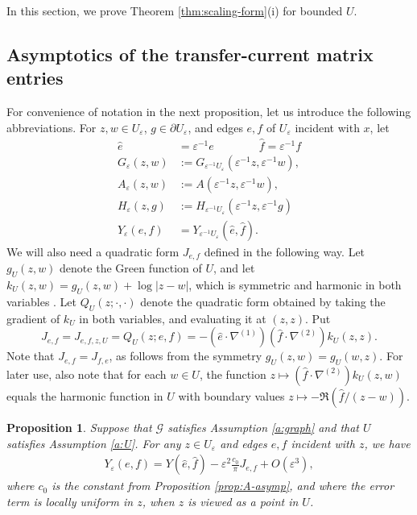 \documentclass[11pt]{article}
\newtheorem{proposition}[theorem]{Proposition}
\theoremstyle{remark}
\def\eps{\varepsilon}
\def\cG{\mathcal{G}}
\newcommand{\eqn}[2]{\begin{equation}\label{#1}#2\end{equation}}
\newcommand{\eqnspl}[2]{\begin{equation}\begin{split}\label{#1}%
   #2\end{split}\end{equation}}
\newcommand{\eqnsplst}[1]{\begin{equation*}\begin{split}%
   #1\end{split}\end{equation*}}
\begin{document}
In this section, we prove Theorem \ref{thm:scaling-form}(i) for bounded $U$.

\subsection{Asymptotics of the transfer-current matrix entries}
\label{ssec:transf-current}

For convenience of notation in the next proposition, let us introduce the following abbreviations. For 
$z, w \in U_\eps$, $g \in \partial U_\eps$, and edges $e, f$ of $U_\eps$ incident with $x$, let
\eqnsplst{
  \hat{e}
  &= \eps^{-1} e \qquad\qquad \hat{f} = \eps^{-1} f \\
  G_{\eps}(z,w)
  &:= G_{\eps^{-1} U_\eps} (\eps^{-1} z, \eps^{-1} w), \\
  A_\eps(z,w)
  &:= A(\eps^{-1} z, \eps^{-1} w), \\
  H_{\eps}(z,g)
  &:= H_{\eps^{-1} U_\eps} (\eps^{-1} z, \eps^{-1} g) \\
  Y_{\eps}(e,f)
  &= Y_{\eps^{-1} U_\eps} ( \hat{e}, \hat{f} ). }
We will also need a quadratic form $J_{e,f}$ defined in the following way. 
Let $g_U(z,w)$ denote the Green function of $U$, and let 
$k_U(z,w) = g_U(z,w) + \log|z-w|$, which is symmetric and 
harmonic in both variables \cite[Chapter 10]{Conway-book-I}. Let $Q_{U}(z; \cdot, \cdot)$ 
denote the quadratic form obtained by taking the gradient of $k_U$ in both variables, and 
evaluating it at $(z,z)$. Put
\eqn{e:Jef-def}
{  J_{e,f}
   = J_{e,f,z,U}
   = Q_U(z;e,f)
   = - (\hat{e} \cdot \nabla^{(1)})(\hat{f} \cdot \nabla^{(2)}) k_U (z,z). }
Note that $J_{e,f} = J_{f,e}$, as follows from the symmetry $g_U(z,w) = g_U(w,z)$.
For later use, also note that for each $w \in U$, the 
function $z \mapsto (\hat{f} \cdot \nabla^{(2)}) k_U(z,w)$ equals the harmonic function 
in $U$ with boundary values $z \mapsto - \Re (\hat{f}/(z - w))$.

\begin{proposition}
\label{prop:Y-asymp} 
Suppose that $\cG$ satisfies Assumption \ref{a:graph} and that $U$ satisfies 
Assumption \ref{a:U}.
For any $z \in U_\eps$ and edges $e,f$ incident with $z$, we have 
\eqnspl{e:Yeps-asymp}{
 Y_{\eps}(e,f)
 = Y(\hat{e}, \hat{f}) - \eps^2 \frac{c_0}{\pi} J_{e,f} + O(\eps^3), }
where $c_0$ is the constant from Proposition \ref{prop:A-asymp}, and
where the error term is locally uniform in $z$, when $z$ is viewed as a point in $U$.\\
\end{proposition}
\end{document}
